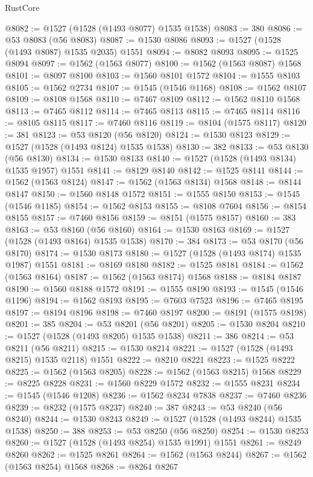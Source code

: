 \begin{lexlean}{RustCore}
\begin{coremodule}
@8082 := @1527 (@1528 (@1493 @8077) @1535 @1538)
@8083 := 380
@8086 := @53 @8083 (@56 @8083)
@8087 := @1530 @8086
@8093 := @1527 (@1528 (@1493 @8087) @1535 @2035) @1551
@8094 := @8082 @8093
@8095 := @1525 @8094
@8097 := @1562 (@1563 @8077)
@8100 := @1562 (@1563 @8087) @1568
@8101 := @8097 @8100
@8103 := @1560 @8101 @1572
@8104 := @1555 @8103
@8105 := @1562 @2734
@8107 := @1545 (@1546 @1168)
@8108 := @1562 @8107
@8109 := @8108 @1568
@8110 := @7467 @8109
@8112 := @1562 @8110 @1568
@8113 := @7465 @8112
@8114 := @7465 @8113
@8115 := @7465 @8114
@8116 := @8105 @8115
@8117 := @7460 @8116
@8119 := @8104 (@1575 @8117)
@8120 := 381
@8123 := @53 @8120 (@56 @8120)
@8124 := @1530 @8123
@8129 := @1527 (@1528 (@1493 @8124) @1535 @1538)
@8130 := 382
@8133 := @53 @8130 (@56 @8130)
@8134 := @1530 @8133
@8140 := @1527 (@1528 (@1493 @8134) @1535 @1957) @1551
@8141 := @8129 @8140
@8142 := @1525 @8141
@8144 := @1562 (@1563 @8124)
@8147 := @1562 (@1563 @8134) @1568
@8148 := @8144 @8147
@8150 := @1560 @8148 @1572
@8151 := @1555 @8150
@8153 := @1545 (@1546 @1185)
@8154 := @1562 @8153
@8155 := @8108 @7604
@8156 := @8154 @8155
@8157 := @7460 @8156
@8159 := @8151 (@1575 @8157)
@8160 := 383
@8163 := @53 @8160 (@56 @8160)
@8164 := @1530 @8163
@8169 := @1527 (@1528 (@1493 @8164) @1535 @1538)
@8170 := 384
@8173 := @53 @8170 (@56 @8170)
@8174 := @1530 @8173
@8180 := @1527 (@1528 (@1493 @8174) @1535 @1987) @1551
@8181 := @8169 @8180
@8182 := @1525 @8181
@8184 := @1562 (@1563 @8164)
@8187 := @1562 (@1563 @8174) @1568
@8188 := @8184 @8187
@8190 := @1560 @8188 @1572
@8191 := @1555 @8190
@8193 := @1545 (@1546 @1196)
@8194 := @1562 @8193
@8195 := @7603 @7523
@8196 := @7465 @8195
@8197 := @8194 @8196
@8198 := @7460 @8197
@8200 := @8191 (@1575 @8198)
@8201 := 385
@8204 := @53 @8201 (@56 @8201)
@8205 := @1530 @8204
@8210 := @1527 (@1528 (@1493 @8205) @1535 @1538)
@8211 := 386
@8214 := @53 @8211 (@56 @8211)
@8215 := @1530 @8214
@8221 := @1527 (@1528 (@1493 @8215) @1535 @2118) @1551
@8222 := @8210 @8221
@8223 := @1525 @8222
@8225 := @1562 (@1563 @8205)
@8228 := @1562 (@1563 @8215) @1568
@8229 := @8225 @8228
@8231 := @1560 @8229 @1572
@8232 := @1555 @8231
@8234 := @1545 (@1546 @1208)
@8236 := @1562 @8234 @7838
@8237 := @7460 @8236
@8239 := @8232 (@1575 @8237)
@8240 := 387
@8243 := @53 @8240 (@56 @8240)
@8244 := @1530 @8243
@8249 := @1527 (@1528 (@1493 @8244) @1535 @1538)
@8250 := 388
@8253 := @53 @8250 (@56 @8250)
@8254 := @1530 @8253
@8260 := @1527 (@1528 (@1493 @8254) @1535 @1991) @1551
@8261 := @8249 @8260
@8262 := @1525 @8261
@8264 := @1562 (@1563 @8244)
@8267 := @1562 (@1563 @8254) @1568
@8268 := @8264 @8267

\end{coremodule}
\end{lexlean}
